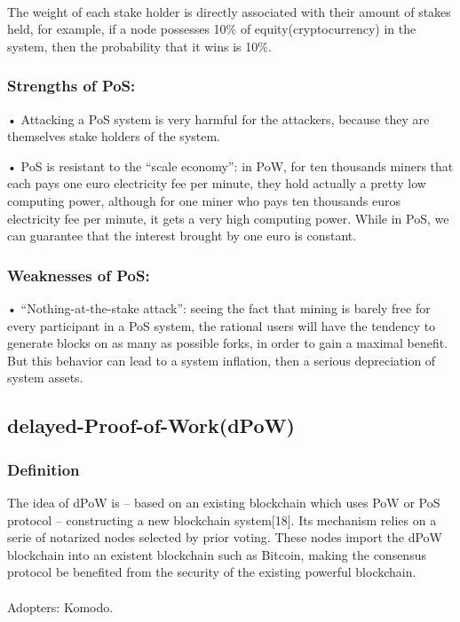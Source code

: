 \documentclass[]{article}
\begin{document}
\begin{CJK*}{UTF8}{gbsn}
	\paragraph{}
	 The weight of each stake holder is directly associated with their amount of stakes held, for example, if a node possesses 10\% of equity(cryptocurrency) in the system, then the probability that it wins is 10\%.
	\subsubsection*{Strengths of PoS:}	
    • Attacking a PoS system is very harmful for the attackers, because they are themselves stake holders of the system.
    \par • PoS is resistant to the “scale economy”: in PoW, for ten thousands miners that each pays one euro electricity fee per minute, they hold actually a pretty low computing power, although for one miner who pays ten thousands euros electricity fee per minute, it gets a very high computing power. While in PoS, we can guarantee that the interest brought by one euro is constant.
	\subsubsection*{Weaknesses of PoS:}	
    • “Nothing-at-the-stake attack”: seeing the fact that mining is barely free for every participant in a PoS system, the rational users will have the tendency to generate blocks on as many as possible forks, in order to gain a maximal benefit. But this behavior can lead to a system inflation, then a serious depreciation of system assets.
    
    \subsection{delayed-Proof-of-Work(dPoW)}
    \subsubsection*{Definition}	
    The idea of dPoW is – based on an existing blockchain which uses PoW or PoS protocol – constructing a new blockchain system[18]. Its mechanism relies on a serie of notarized nodes selected by prior voting. These nodes import the dPoW blockchain into an existent blockchain such as Bitcoin, making the consensus protocol be benefited from the security of the existing powerful blockchain.  
    \paragraph{}
    Adopters: Komodo.

\end{CJK*}
\end{document}
